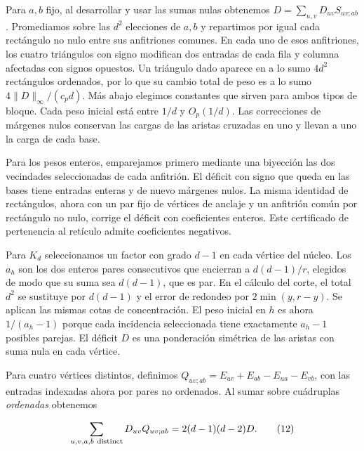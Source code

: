 \documentclass[spanish,11pt,a4paper]{article}
\begin{document}
Para \(a,b\) fijo, al desarrollar y usar las sumas nulas obtenemos \(D=\sum_{u,v}D_{uv}S_{uv;ab}\). Promediamos sobre las \(d^2\) elecciones de \(a,b\) y repartimos por igual cada rectángulo no nulo entre sus anfitriones comunes. En cada uno de esos anfitriones, los cuatro triángulos con signo modifican dos entradas de cada fila y columna afectadas con signos opuestos. Un triángulo dado aparece en a lo sumo \(4d^2\) rectángulos ordenados, por lo que su cambio total de peso es a lo sumo \(4\|D\|_\infty/(c_pd)\). Más abajo elegimos constantes que sirven para ambos tipos de bloque. Cada peso inicial está entre \(1/d\) y \(O_p(1/d)\). Las correcciones de márgenes nulos conservan las cargas de las aristas cruzadas en uno y llevan a uno la carga de cada base.

Para los pesos enteros, emparejamos primero mediante una biyección las dos vecindades seleccionadas de cada anfitrión. El déficit con signo que queda en las bases tiene entradas enteras y de nuevo márgenes nulos. La misma identidad de rectángulos, ahora con un par fijo de vértices de anclaje y un anfitrión común por rectángulo no nulo, corrige el déficit con coeficientes enteros. Este certificado de pertenencia al retículo admite coeficientes negativos.

Para \(K_d\) seleccionamos un factor con grado \(d-1\) en cada vértice del núcleo. Los \(a_h\) son los dos enteros pares consecutivos que encierran a \(d(d-1)/r\), elegidos de modo que su suma sea \(d(d-1)\), que es par. En el cálculo del corte, el total \(d^2\) se sustituye por \(d(d-1)\) y el error de redondeo por \(2\min(y,r-y)\). Se aplican las mismas cotas de concentración. El peso inicial en \(h\) es ahora \(1/(a_h-1)\) porque cada incidencia seleccionada tiene exactamente \(a_h-1\) posibles parejas. El déficit \(D\) es una ponderación simétrica de las aristas con suma nula en cada vértice.

Para cuatro vértices distintos, definimos \(Q_{uv;ab}=E_{uv}+E_{ab}-E_{ua}-E_{vb}\), con las entradas indexadas ahora por pares no ordenados. Al sumar sobre cuádruplas \emph{ordenadas} obtenemos

\[\sum_{u,v,a,b\ {\rm distinct}}D_{uv}Q_{uv;ab}
       =2(d-1)(d-2)D.
\tag{12}\]
\end{document}
